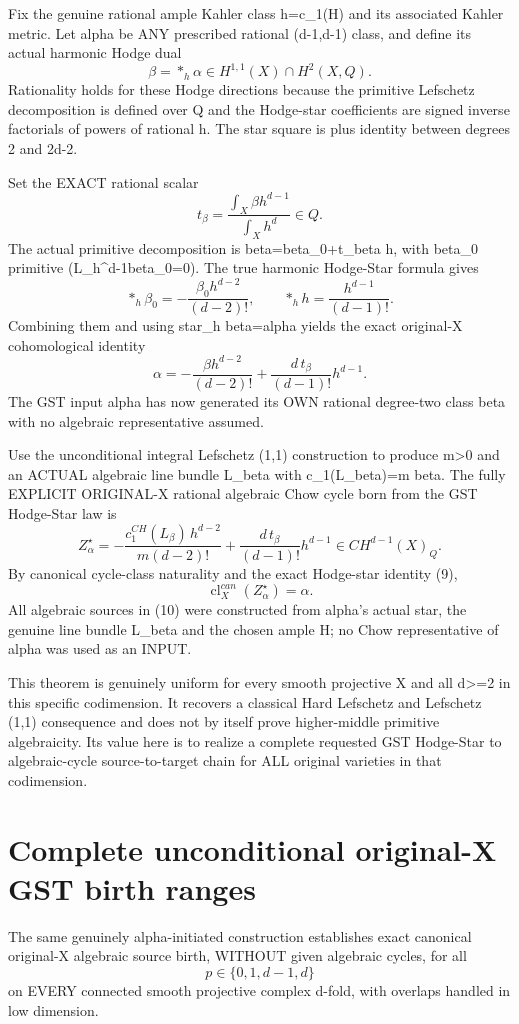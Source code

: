 \documentclass[11pt]{article}
\begin{document}
Fix the genuine rational ample Kahler class
h=c_1(H) and its associated Kahler metric.
Let alpha be ANY prescribed rational
(d-1,d-1) class, and define its actual
harmonic Hodge dual
\[
\boxed{\beta=*_h\alpha\in
H^{1,1}(X)\cap H^2(X,Q).}
\]
Rationality holds for these Hodge
directions because the primitive
Lefschetz decomposition is defined
over Q and the Hodge-star
coefficients are signed inverse
factorials of powers of rational h.
The star square is plus identity
between degrees 2 and 2d-2.

Set the EXACT rational scalar
\[
t_\beta=
\frac{\int_X\beta h^{d-1}}
     {\int_X h^d}\in Q.
\]
The actual primitive decomposition is
beta=beta_0+t_beta h, with beta_0 primitive
(L_h^{d-1}beta_0=0).
The true harmonic Hodge-Star formula gives
\[
*_h \beta_0
=-\frac{\beta_0 h^{d-2}}{(d-2)!},
\qquad
*_h h=\frac{h^{d-1}}{(d-1)!}.
\]
Combining them and using
star_h beta=alpha yields the exact
original-X cohomological identity
\[
\boxed{
\alpha=-\frac{\beta h^{d-2}}{(d-2)!}
+\frac{d\,t_\beta}{(d-1)!}h^{d-1}.
}\tag{9}
\]
The GST input alpha has now
generated its OWN rational
degree-two class beta with
no algebraic representative assumed.

Use the unconditional integral
Lefschetz (1,1) construction to
produce m>0 and an ACTUAL algebraic
line bundle L_beta with
c_1(L_beta)=m beta.
The fully EXPLICIT ORIGINAL-X
rational algebraic Chow cycle
born from the GST Hodge-Star law is
\[
\boxed{
Z^{\star}_{\alpha}=
-\frac{c_1^{CH}(L_\beta)\,h^{d-2}}
 {m(d-2)!}
+\frac{d\,t_\beta}{(d-1)!}h^{d-1}
\in CH^{d-1}(X)_Q.
}\tag{10}
\]
By canonical cycle-class naturality
and the exact Hodge-star identity (9),
\[
\boxed{\operatorname{cl}^{can}_X
(Z^\star_\alpha)=\alpha.}
\]
All algebraic sources in (10) were
constructed from alpha's actual star,
the genuine line bundle L_beta and
the chosen ample H; no Chow representative
of alpha was used as an INPUT.

This theorem is genuinely uniform
for every smooth projective X and
all d>=2 in this specific codimension.
It recovers a classical Hard Lefschetz
and Lefschetz (1,1) consequence and
does not by itself prove higher-middle
primitive algebraicity. Its value
here is to realize a complete requested
GST Hodge-Star to algebraic-cycle
source-to-target chain for ALL
original varieties in that codimension.


\section{Complete unconditional original-X GST birth ranges}
The same genuinely alpha-initiated construction
establishes exact canonical original-X
algebraic source birth, WITHOUT given
algebraic cycles, for all
\[
\boxed{p\in\{0,1,d-1,d\}}
\]
on EVERY connected smooth projective complex
d-fold, with overlaps handled in low dimension.
\end{document}

